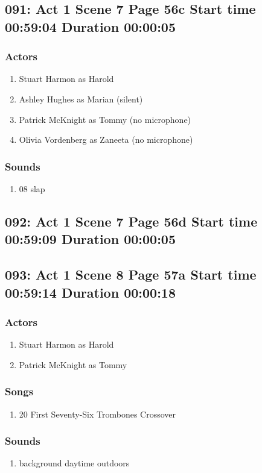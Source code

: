 \subsection{091: Act 1 Scene 7 Page 56c Start time 00:59:04 Duration 00:00:05}

\subsubsection{Actors}
\begin{enumerate}
\item Stuart Harmon as Harold
\item Ashley Hughes as Marian (silent)
\item Patrick McKnight as Tommy (no microphone)
\item Olivia Vordenberg as Zaneeta (no microphone)
\end{enumerate}

\subsubsection{Sounds}
\begin{enumerate}
\item 08 slap
\end{enumerate}
\subsection{092: Act 1 Scene 7 Page 56d Start time 00:59:09 Duration 00:00:05}

\subsection{093: Act 1 Scene 8 Page 57a Start time 00:59:14 Duration 00:00:18}

\subsubsection{Actors}
\begin{enumerate}
\item Stuart Harmon as Harold
\item Patrick McKnight as Tommy
\end{enumerate}

\subsubsection{Songs}
\begin{enumerate}
\item 20 First Seventy-Six Trombones Crossover
\end{enumerate}\subsubsection{Sounds}
\begin{enumerate}
\item background daytime outdoors
\end{enumerate}
